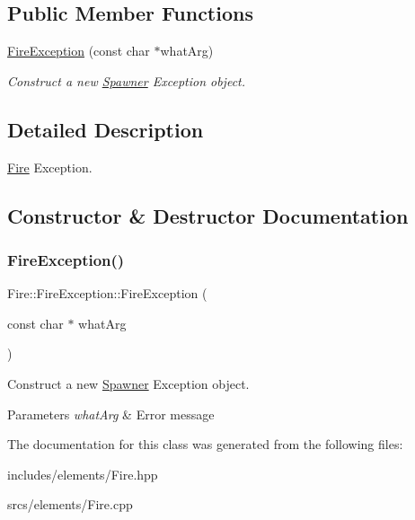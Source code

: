 \subsection*{Public Member Functions}
\begin{DoxyCompactItemize}
\item 
\hyperlink{class_fire_1_1_fire_exception_a65dfaf8ec245d6bad64245dbd9667f45}{Fire\+Exception} (const char $\ast$what\+Arg)
\begin{DoxyCompactList}\small\item\em Construct a new \hyperlink{class_spawner}{Spawner} Exception object. \end{DoxyCompactList}\end{DoxyCompactItemize}


\subsection{Detailed Description}
\hyperlink{class_fire}{Fire} Exception. 

\subsection{Constructor \& Destructor Documentation}
\mbox{\label{class_fire_1_1_fire_exception_a65dfaf8ec245d6bad64245dbd9667f45}} 
\subsubsection{\texorpdfstring{Fire\+Exception()}{FireException()}}
{\footnotesize\ttfamily Fire\+::\+Fire\+Exception\+::\+Fire\+Exception (\begin{DoxyParamCaption}\item[{const char $\ast$}]{what\+Arg }\end{DoxyParamCaption})\hspace{0.3cm}{\ttfamily [explicit]}}



Construct a new \hyperlink{class_spawner}{Spawner} Exception object. 


\begin{DoxyParams}{Parameters}
{\em what\+Arg} & Error message \\
\hline
\end{DoxyParams}


The documentation for this class was generated from the following files\+:\begin{DoxyCompactItemize}
\item 
includes/elements/Fire.\+hpp\item 
srcs/elements/Fire.\+cpp\end{DoxyCompactItemize}
